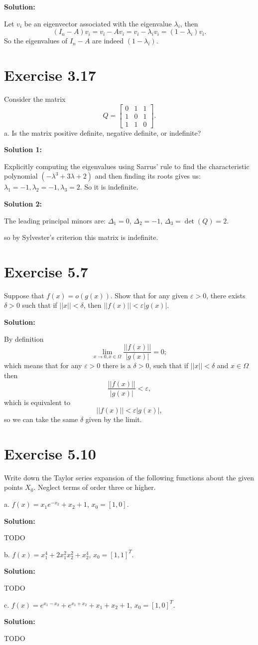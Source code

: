 \documentclass{article}
\begin{document}
\textbf{Solution:}

Let $v_i$ be an eigenvector associated with the eigenvalue $\lambda_i$, then
\[
	(I_n-A)v_i=v_i-Av_i=v_i-\lambda_iv_i=(1-\lambda_i)v_i.
\]
So the eigenvalues of $I_n-A$ are indeed $(1-\lambda_i)$.
\section*{Exercise 3.17}
Consider the matrix
\[ Q=
\begin{bmatrix}
0 & 1 & 1\\	
1 & 0 & 1\\
1 & 1 & 0
\end{bmatrix}.
\]
a. Is the matrix positive definite, negative definite, or indefinite?

\textbf{Solution 1:}

Explicitly computing the eigenvalues using Sarrus' rule to find the characteristic
polynomial $(-\lambda^3+3\lambda+2)$ and then finding its roots gives us:\\
$\lambda_1=-1,\lambda_2=-1,\lambda_3=2$. So it is indefinite.

\textbf{Solution 2:}

The leading principal minors are: $\Delta_1=0$, $\Delta_2=-1$,
$\Delta_3=\det(Q)=2$.

so by Sylvester's criterion this matrix is indefinite.
\section*{Exercise 5.7}
Suppose that $f(x)=o(g(x))$. Show that for any given $\varepsilon >0$, there
exists $\delta>0$ such that if $||x||< \delta$, then $||f(x)||<\varepsilon |g(x)|$.

\textbf{Solution:}

By definition
\[
	\lim_{x\to 0,x\in\Omega} \frac{||f(x)||}{|g(x)|}=0;
\]
which means that for any $\varepsilon >0$ there is a $\delta>0$, such that if
$||x||<\delta$ and $x\in\Omega$ then
\[
	\frac{||f(x)||}{|g(x)|}<\varepsilon,
\]
which is equivalent to
\[
	||f(x)||<\varepsilon|g(x)|,
\]
so we can take the same $\delta$ given by the limit.
\section*{Exercise 5.10}
Write down the Taylor series expansion of the following functions about the
given points $X_0$. Neglect terms of order three or higher.

a. $f(x)=x_1e^{-x_2}+x_2+1$, $x_0=[1,0]$.

\textbf{Solution:}

TODO

b. $f(x)=x_1^4+2x_1^2x_2^2 +x_2^4$, $x_0=[1,1]^T$.

\textbf{Solution:}

TODO

c. $f(x)=e^{x_1-x_2}+e^{x_1+x_2}+x_1+x_2+1$, $x_0=[1,0]^T$.

\textbf{Solution:}

TODO
\end{document}
